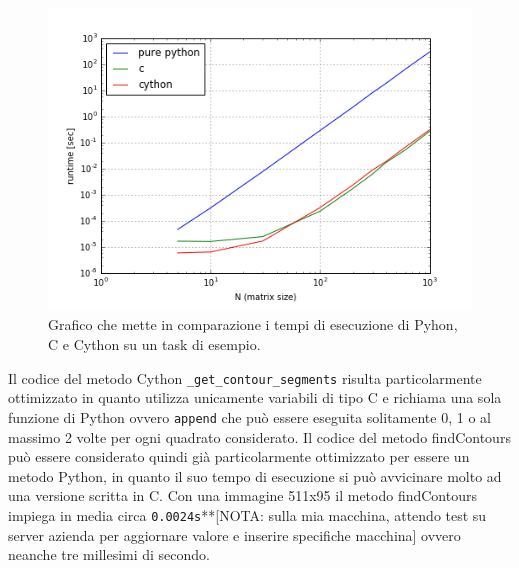 \documentclass[12pt,a4paper]{report}
\begin{document}
\begin{figure}[H]
    \centering
    \includegraphics[scale=0.9]{img/cython-vs-c.png}
    \caption{Grafico che mette in comparazione i tempi di esecuzione di Pyhon, C e Cython su un task di esempio. 
}
\end{figure} \newpage
Il codice del metodo Cython \verb|_get_contour_segments| risulta particolarmente ottimizzato in quanto utilizza unicamente variabili di tipo C e richiama una sola funzione di Python ovvero \verb|append| che può essere eseguita solitamente 0, 1 o al massimo 2 volte per ogni quadrato considerato. 
Il codice del metodo findContours può essere considerato quindi già particolarmente ottimizzato per essere un metodo Python, in quanto il suo tempo di esecuzione si può avvicinare molto ad una versione scritta in C. \newline
Con una immagine 511x95 il metodo findContours impiega in media circa \verb|0.0024s|**[NOTA: sulla mia macchina,  attendo test su server azienda per aggiornare valore e inserire specifiche macchina] %
ovvero neanche tre millesimi di secondo.
\end{document}
